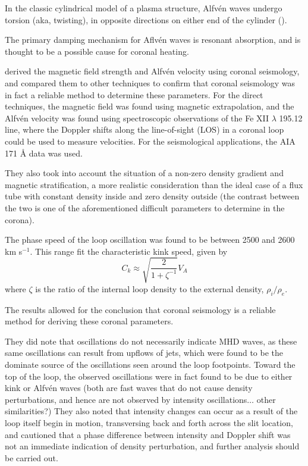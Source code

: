 \documentclass[preprint2]{aastex}
\begin{document}
In the classic cylindrical model of a plasma structure,
Alfv\'en waves undergo torsion (aka, twisting), in opposite directions on
either end of the cylinder (\cite{Nak}).

The primary damping mechanism for Aflv\'en waves is resonant absorption,
and is thought to be a possible cause for coronal heating.

\cite{tor_1} derived the magnetic field strength and Alfv\'en velocity
using coronal seismology, and compared them to other techniques to
confirm that coronal seismology was in fact a reliable method to determine
these parameters. For the direct techniques,
the magnetic field was found using magnetic extrapolation,
and the Alfv\'en velocity was found
using spectroscopic observations of the Fe
{\footnotesize XII} $\lambda$ 195.12 line, where the Doppler shifts
along the line-of-sight (LOS) in a coronal loop could be used to
measure velocities. For the seismological applications, the AIA
171 \AA{} data was used.

They also took into account the situation of a non-zero density
gradient and magnetic stratification, a more realistic consideration
than the ideal case of a flux tube with constant density inside
and zero density outside (the contrast between the two is one of
the aforementioned difficult parameters to determine in the corona).

The phase speed of the loop oscillation was found to be between
2500 and 2600 km s$^{-1}$. This range fit the characteristic kink
speed, given by
\begin{equation}\label{kink_speed}
    C_k \approx \sqrt{\frac{2}{1+\zeta^{-1}}}V_A
\end{equation}
where $\zeta$ is the ratio of the internal loop density to the external
density, $\rho_i/\rho_e$.

The results allowed for the conclusion that coronal seismology is a
reliable method for deriving these coronal parameters.

They did note that oscillations do not necessarily indicate MHD waves,
as these same oscillations can result from upflows of jets, which were
found to be the dominate source of the oscillations seen around the loop
footpoints. Toward the top of the loop, the observed oscillations were
in fact found to be due to either kink or Alfv\'en waves
(both are fast waves that do not cause density perturbations, and
hence are not observed by intensity oscillations$\ldots$ other
similarities?) They also noted that intensity changes can occur as
a result of the loop itself begin in motion, transversing back and
forth across the slit location, and cautioned that a phase difference
between intensity and Doppler shift was not an immediate indication
of density perturbation, and further analysis should be carried out.
\end{document}
